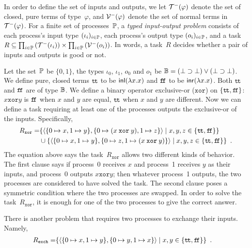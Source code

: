 In order to define the set of inputs and outputs, we let
$\mathcal{T}^-(\varphi)$ denote the set of closed, pure terms of
type~$\varphi$,
and $\mathcal{V}^-(\varphi)$ denote the set of normal terms in $\mathcal{T}^-(\varphi)$.
For a finite set of processes~$\mathbb{P}$,
a \textit{typed input-output problem} consists
of each process's input type
$(\iota_i)_{i\in \mathbb{P}}$, each process's output type $(o_i)_{i\in
\mathbb{P}}$, and a
task $R\subseteq \prod_{i\in \mathbb{P}}\left(\mathcal{T}^-(\iota_i)\right)\times
 \prod_{i\in \mathbb{P}}\left(\mathcal{V}^-(o_i)\right)$.
 In words, a task~$R$ decides whether a pair of inputs and outputs is
 good or not.

\newcommand{\true}{\texttt{t\kern -1.2pt t}}
\newcommand{\false}{\texttt{f\kern -1.7pt f}}
\newcommand{\xor}{\mathbin{\mathtt{xor}}}
 \begin{example}
  \label{ex:xor}
  Let the set~$\mathbb{P}$ be $\{0,1\}$,
  the types $\iota_0$, $\iota_1$, $o_0$ and $o_1$ be
  $\mathbb{B} = (\bot\supset\bot)\lor(\bot\supset\bot)$.
  We define pure, closed terms
  $\true$ to be $\mathsf{inl}({\lambda x.x})$ and
  $\false$ to be $\mathsf{inr}({\lambda x.x})$.
  Both $\true$ and $\false$ are of type $\mathbb{B}$.
  We define a binary operator exclusive-or ($\mathtt{xor}$) on
  $\{\true,\false\}$:
  $x \xor y$ is $\false$ when $x$ and $y$ are equal, $\true$ when $x$
  and $y$ are different.
  Now we can define a task requiring at least one of the processes outputs
  the exclusive-or of the inputs.  Specifically,
  \begin{align*}
   R_{\mathtt{xor}} =&
   \{\tuple{\{0\mapsto x, 1\mapsto y\},\{0\mapsto (x\xor y), 1\mapsto z\}}\mid
   x,y,z\in\{\true,\false\}\}
   \\ & \cup \{\tuple{\{0\mapsto x, 1\mapsto y\},\{0\mapsto z, 1\mapsto
   (x \xor y)\}}\mid
   x,y,z\in\{\true,\false\}\}\enspace.
  \end{align*}
  The equation above says the task~$R_{\mathtt{xor}}$ allows two different kinds of
  behavior.  The first clause says if process~0 receives $x$ and
  process~1 receives $y$ as their inputs, and process~0 outputs $x\xor
  y$; then whatever process~1 outputs, the two processes are considered
  to have solved the task.  The second clause poses a symmetric
  condition where the two processes are swapped.
  In order to solve the task~$R_{\mathtt{xor}}$,
  it is enough for one of the two processes to give the correct answer.
 \end{example}
  \begin{example}
   \label{ex:exchange}
   There is another problem that requires
   two processes to exchange their inputs.  Namely,
  \begin{align*}
   R_{\mathtt{exch}} =&
   \{\tuple{\{0\mapsto x, 1\mapsto y\},\{0\mapsto y, 1\mapsto x\}}\mid
   x,y\in\{\true,\false\}\}\enspace.
  \end{align*}
  \end{example}

